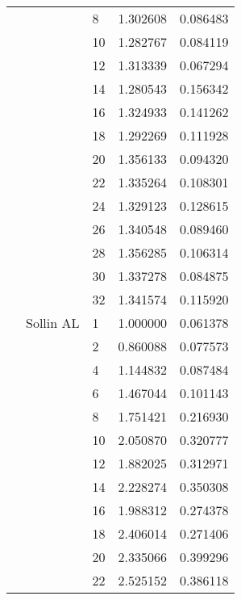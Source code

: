 \begin{tabular}{lllrr}
                      &            & 8  &  1.302608 &  0.086483 \\
                      &            & 10 &  1.282767 &  0.084119 \\
                      &            & 12 &  1.313339 &  0.067294 \\
                      &            & 14 &  1.280543 &  0.156342 \\
                      &            & 16 &  1.324933 &  0.141262 \\
                      &            & 18 &  1.292269 &  0.111928 \\
                      &            & 20 &  1.356133 &  0.094320 \\
                      &            & 22 &  1.335264 &  0.108301 \\
                      &            & 24 &  1.329123 &  0.128615 \\
                      &            & 26 &  1.340548 &  0.089460 \\
                      &            & 28 &  1.356285 &  0.106314 \\
                      &            & 30 &  1.337278 &  0.084875 \\
                      &            & 32 &  1.341574 &  0.115920 \\
                      & Sollin AL & 1  &  1.000000 &  0.061378 \\
                      &            & 2  &  0.860088 &  0.077573 \\
                      &            & 4  &  1.144832 &  0.087484 \\
                      &            & 6  &  1.467044 &  0.101143 \\
                      &            & 8  &  1.751421 &  0.216930 \\
                      &            & 10 &  2.050870 &  0.320777 \\
                      &            & 12 &  1.882025 &  0.312971 \\
                      &            & 14 &  2.228274 &  0.350308 \\
                      &            & 16 &  1.988312 &  0.274378 \\
                      &            & 18 &  2.406014 &  0.271406 \\
                      &            & 20 &  2.335066 &  0.399296 \\
                      &            & 22 &  2.525152 &  0.386118 \\

\end{tabular}
